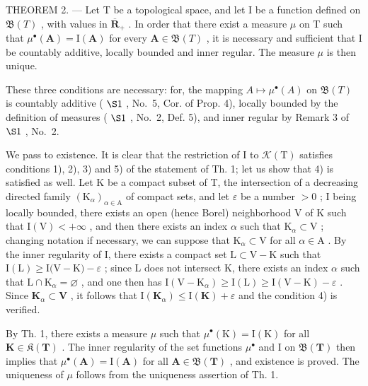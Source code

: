THEOREM 2. --- Let T be a topological space, and let I be a function defined on \(\mathfrak{B}(T)\) , with values in \(\overline{\mathbf{R}}_{+}\) . In order that there exist a measure \(\mu\) on T such that \(\mu^{\bullet}(\mathbf{A}) = \mathrm{I}(\mathbf{A})\) for every \(\mathbf{A} \in \mathfrak{B}(T)\) , it is necessary and sufficient that I be countably additive, locally bounded and inner regular. The measure \(\mu\) is then unique.

These three conditions are necessary: for, the mapping \(A \mapsto \mu^{\bullet}(A)\) on \(\mathfrak{B}(T)\) is countably additive ( \(\S1\) , No.~5, Cor. of Prop. 4), locally bounded by the definition of measures ( \(\S1\) , No.~2, Def. 5), and inner regular by Remark 3 of \(\S1\) , No.~2.

We pass to existence. It is clear that the restriction of I to \(\mathcal{K}(\mathrm{T})\) satisfies conditions 1), 2), 3) and 5) of the statement of Th. 1; let us show that 4) is satisfied as well. Let K be a compact subset of T, the intersection of a decreasing directed family \((\mathrm{K}_{\alpha})_{\alpha \in \mathrm{A}}\) of compact sets, and let \(\varepsilon\) be a number \(>0\) ; I being locally bounded, there exists an open (hence Borel) neighborhood V of K such that \(\mathrm{I(V)} < +\infty\) , and then there exists an index \(\alpha\) such that \(\mathrm{K}_{\alpha} \subset \mathrm{V}\) ; changing notation if necessary, we can suppose that \(\mathrm{K}_{\alpha} \subset \mathrm{V}\) for all \(\alpha \in \mathrm{A}\) . By the inner regularity of I, there exists a compact set \(\mathrm{L} \subset \mathrm{V} - \mathrm{K}\) such that \(\mathrm{I(L)} \geqslant \mathrm{I(V} - \mathrm{K)} - \varepsilon\) ; since L does not intersect K, there exists an index \(\alpha\) such that \(\mathrm{L} \cap \mathrm{K}_{\alpha} = \varnothing\) , and one then has \(\mathrm{I}(\mathrm{V} - \mathrm{K}_{\alpha}) \geqslant \mathrm{I}(\mathrm{L}) \geqslant \mathrm{I}(\mathrm{V} - \mathrm{K}) - \varepsilon\) . Since \(\mathbf{K}_{\alpha} \subset \mathbf{V}\) , it follows that \(\mathrm{I}(\mathbf{K}_{\alpha}) \leqslant \mathrm{I}(\mathbf{K}) + \varepsilon\) and the condition 4) is verified.

By Th. 1, there exists a measure \(\mu\) such that \(\mu^{\bullet}(\mathrm{K}) = \mathrm{I}(\mathrm{K})\) for all \(\mathbf{K} \in \mathfrak{K}(\mathbf{T})\) . The inner regularity of the set functions \(\mu^{\bullet}\) and I on \(\mathfrak{B}(\mathbf{T})\) then implies that \(\mu^{\bullet}(\mathbf{A}) = \mathrm{I}(\mathbf{A})\) for all \(\mathbf{A} \in \mathfrak{B}(\mathbf{T})\) , and existence is proved. The uniqueness of \(\mu\) follows from the uniqueness assertion of Th. 1.

